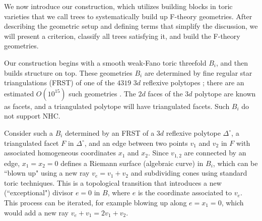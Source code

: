\documentclass[aps,prl,twocolumn, superscriptaddress,groupedaddress,nofootinbib]{revtex4-1}
\begin{document}
\vspace{.2cm}

We now introduce our construction, which utilizes building blocks in toric
varieties that we call trees to systematically build up F-theory geometries.
After describing the geometric setup and defining terms that simplify the
discussion, we will present a criterion, classify all trees satisfying it, and
build the F-theory geometries.


Our construction begins with a smooth weak-Fano toric threefold $B_i$, and
then builds structure on top. These geometries $B_i$ are  determined by
fine regular star triangulations (FRST) of one of the $4319$  $3d$ reflexive
polytopes \cite{Kreuzer:1998vb}; there are an estimated
 $O(10^{15})$ such geometries \cite{Halverson:2016tve}. The $2d$
faces of the $3d$ polytope are known as facets, and a triangulated polytope
will have triangulated facets.  Such $B_i$ do not support NHC.

Consider such a $B_i$ determined by an FRST of a $3d$ reflexive polytope
$\Delta^\circ$, a triangulated facet $F$ in $\Delta^\circ$, and an edge
between two points $v_1$ and $v_2$ in $F$ with
associated homogeneous coordinates $x_1$ and $x_2$. Since $v_{1,2}$ are connected
by an edge, $x_1=x_2=0$ defines a Riemann surface (algebraic curve)
in $B_i$, which can be ``blown up" using a new ray $v_e=v_1+v_2$ and subdividing
cones using standard toric techniques. This is a topological transition that introduces
a new (``exceptional") divisor $e=0$ in $B$, where $e$ is the coordinate associated to $v_e$.
This
process can be iterated, for example blowing up along $e=x_1=0$, which would
add a new ray $v_e+v_1=2v_1+v_2$.
\end{document}
